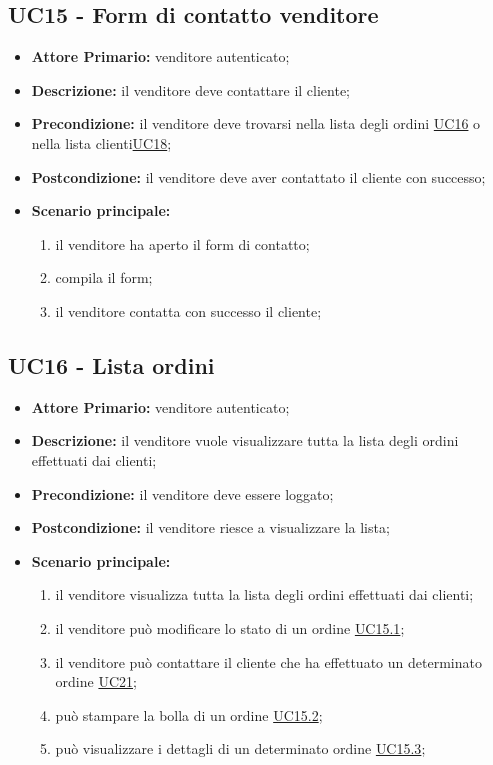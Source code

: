 \subsection{UC15 - Form di contatto venditore}
\label{UC15}
\begin{itemize}
    \item \textbf{Attore Primario:} venditore autenticato;
    \item \textbf{Descrizione:} il venditore deve contattare il cliente;
    \item \textbf{Precondizione:} il venditore deve trovarsi nella lista degli ordini \hyperref[UC16]{UC16} o nella lista clienti\hyperref[UC18]{UC18};
    \item \textbf{Postcondizione:} il venditore deve aver contattato il cliente con successo;
    \item \textbf{Scenario principale:}
    \begin{enumerate}
        \item il venditore ha aperto il form di contatto;
        \item compila il form;
        \item il venditore contatta con successo il cliente;
    \end{enumerate}
\end{itemize}

\subsection{UC16 - Lista ordini}
\label{UC16}
\begin{itemize}
    \item \textbf{Attore Primario:} venditore autenticato;
    \item \textbf{Descrizione:} il venditore vuole visualizzare tutta la lista degli ordini effettuati dai clienti;
    \item \textbf{Precondizione:} il venditore deve essere loggato;
    \item \textbf{Postcondizione:} il venditore riesce a visualizzare la lista;
    \item \textbf{Scenario principale:}
    \begin{enumerate}
        \item il venditore visualizza tutta la lista degli ordini effettuati dai clienti;
         \item il venditore può modificare lo stato di un ordine \hyperref[UC15.1]{UC15.1};
        \item il venditore può contattare il cliente che ha effettuato un determinato ordine \hyperref[UC21]{UC21};
        \item può stampare la bolla di un ordine \hyperref[UC15.2]{UC15.2};
        \item può visualizzare i dettagli di un determinato ordine \hyperref[UC15.3]{UC15.3}; 
    \end{enumerate}
\end{itemize}

